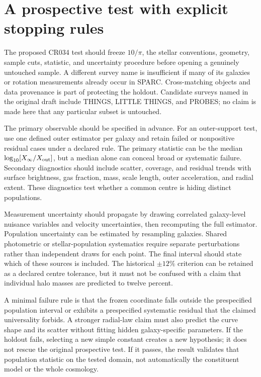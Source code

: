 \section{A prospective test with explicit stopping rules}

The proposed CR034 test should freeze $10/\pi$, the stellar conventions, geometry, sample cuts, statistic, and uncertainty procedure before opening a genuinely untouched sample. A different survey name is insufficient if many of its galaxies or rotation measurements already occur in SPARC. Cross-matching objects and data provenance is part of protecting the holdout. Candidate surveys named in the original draft include THINGS, LITTLE THINGS, and PROBES; no claim is made here that any particular subset is untouched.

The primary observable should be specified in advance. For an outer-support test, use one defined outer estimator per galaxy and retain failed or nonpositive residual cases under a declared rule. The primary statistic can be the median $\log_{10}[X_\infty/X_{\rm out}]$, but a median alone can conceal broad or systematic failure. Secondary diagnostics should include scatter, coverage, and residual trends with surface brightness, gas fraction, mass, scale length, outer acceleration, and radial extent. These diagnostics test whether a common centre is hiding distinct populations.

Measurement uncertainty should propagate by drawing correlated galaxy-level nuisance variables and velocity uncertainties, then recomputing the full estimator. Population uncertainty can be estimated by resampling galaxies. Shared photometric or stellar-population systematics require separate perturbations rather than independent draws for each point. The final interval should state which of these sources is included. The historical $\pm12\%$ criterion can be retained as a declared centre tolerance, but it must not be confused with a claim that individual halo masses are predicted to twelve percent.

A minimal failure rule is that the frozen coordinate falls outside the prespecified population interval or exhibits a prespecified systematic residual that the claimed universality forbids. A stronger radial-law claim must also predict the curve shape and its scatter without fitting hidden galaxy-specific parameters. If the holdout fails, selecting a new simple constant creates a new hypothesis; it does not rescue the original prospective test. If it passes, the result validates that population statistic on the tested domain, not automatically the constituent model or the whole cosmology.

